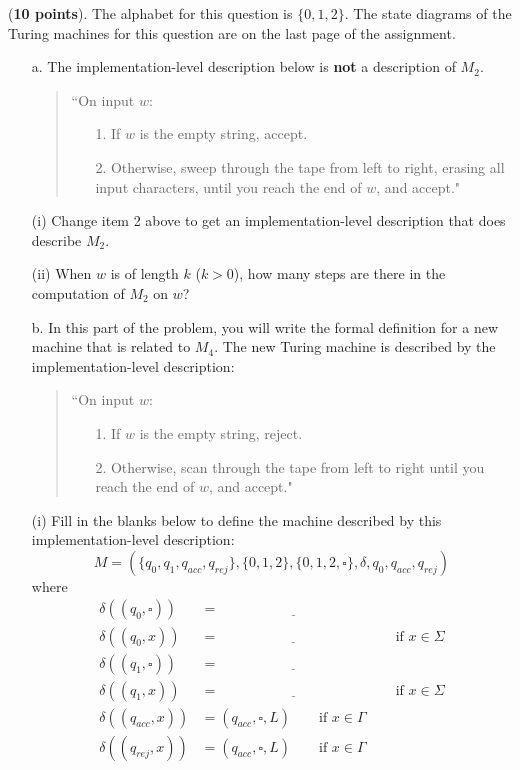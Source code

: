 \documentclass[10pt,letterpaper,unboxed,cm]{hmcpset}
\begin{document}
\begin{problem}[2.]  ({\bf 10 points}). 
The alphabet for this question is $\{0,1,2\}$. The state diagrams of the Turing machines for this question are on the last page
of the assignment. 
\begin{itemize}
\item[a.] The implementation-level description below is {\bf not} a description of $M_2$.
\begin{quote}
``On input $w$:
\begin{itemize}
\item[1.] If $w$ is the empty string, accept.  
\item[2.] Otherwise, sweep through the tape from left to right, erasing all input characters, until you reach the end of $w$, and accept."
\end{itemize}
\end{quote}
(i) Change item 2 above to get an implementation-level description that does describe $M_2$. 

(ii) When $w$ is of length $k$ ($k >0$), how many steps are there in the computation of $M_2$ on $w$? \\


\item[b.] In this part of the problem, you will write the formal definition for a new machine that is related to $M_4.$
The new Turing machine is described by the  implementation-level description:
\begin{quote}
``On input $w$:
\begin{itemize}
\item[1.] If $w$ is the empty string, reject.  
\item[2.] Otherwise, scan through the tape from left to right until you reach the end of $w$, and accept."
\end{itemize}
\end{quote}

(i) Fill in the blanks below to define the machine described by this implementation-level description:
\[
M = (\{q_0, q_1, q_{acc}, q_{rej}\}, \{0,1,2\}, \{0,1,2, \square\}, \delta, q_0, q_{acc}, q_{rej} )
\]
 where
\begin{align*}
\delta( (q_0, \square) ) &= \underline{\phantom{FILL IN BLANK HERE}} \\
\delta ( (q_0 ,x) ) &= \underline{\phantom{FILL IN BLANK HERE}} \qquad \text{if } x  \in \Sigma \\
\delta( (q_1, \square) ) &= \underline{\phantom{FILL IN BLANK HERE}} \\
\delta ( (q_1 ,x) ) &= \underline{\phantom{FILL IN BLANK HERE}} \qquad \text{if } x  \in \Sigma \\
\delta( (q_{acc}, x) ) &= (q_{acc}, \square, L) \qquad \text{if } x \in \Gamma\\
\delta( (q_{rej}, x) ) &= (q_{acc}, \square, L) \qquad \text{if } x \in \Gamma\\
\end{align*}



\end{itemize}
\end{problem}
\end{document}
